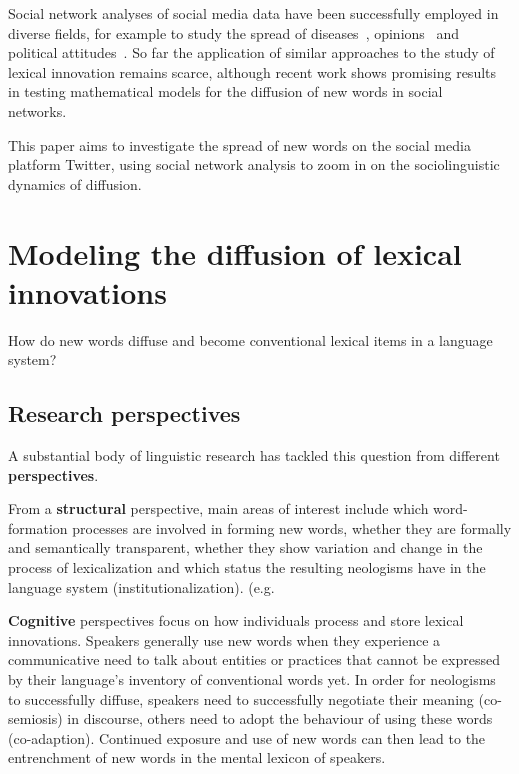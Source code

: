 \documentclass[a4paper, abstract=on]{scrartcl}
\renewcommand{\hw}[1]{\textbf{#1}}
\begin{document}
  Social network analyses of social media data have been successfully employed in diverse fields, for example to study the spread of diseases~\parencite{Lu2018}, opinions~\parencite{West2014} and political attitudes~\parencite{Pew-Research-Center2019}. So far the application of similar approaches to the study of lexical innovation remains scarce, although recent work shows promising results in testing mathematical models for the diffusion of new words in social networks.~\parencite{Goel2016}


  This paper aims to investigate the spread of new words on the social media platform Twitter, using social network analysis to zoom in on the sociolinguistic dynamics of diffusion.

\section{Modeling the diffusion of lexical innovations}

  How do new words diffuse and become conventional lexical items in a language system?

  \subsection{Research perspectives}

    A substantial body of linguistic research has tackled this question from different \hw{perspectives}. \parencite[16]{Schmid2016}

    From a \hw{structural} perspective, main areas of interest include which word-formation processes are involved in forming new words, whether they are formally and semantically transparent, whether they show variation and change in the process of lexicalization and which status the resulting neologisms have in the language system (institutionalization). (e.g. \cite{Bauer1983,Lipka2005}

    \hw{Cognitive} perspectives focus on how individuals process and store lexical innovations. Speakers generally use new words when they experience a communicative need to talk about entities or practices that cannot be expressed by their language's inventory of conventional words yet. In order for neologisms to successfully diffuse, speakers need to successfully negotiate their meaning (co-semiosis) in discourse, others need to adopt the behaviour of using these words (co-adaption). Continued exposure and use of new words can then lead to the entrenchment of new words in the mental lexicon of speakers.~\parencite{Schmid2008}
\end{document}
